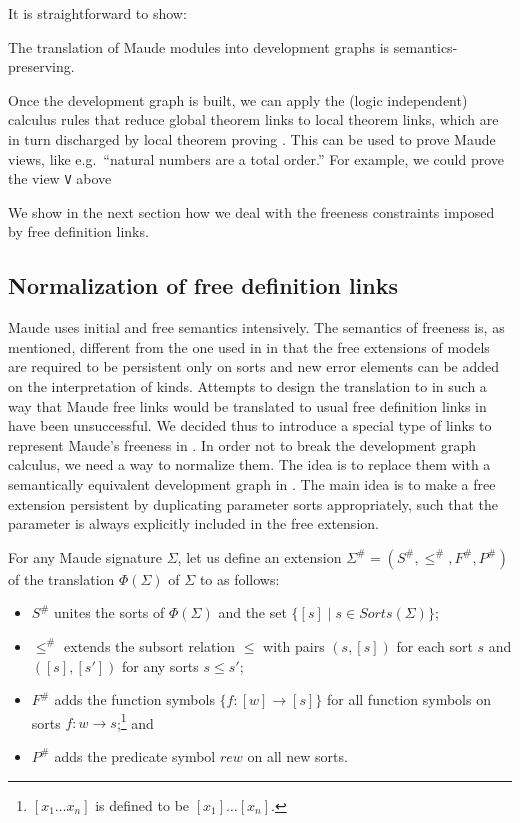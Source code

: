 It is straightforward to show:
\begin{theorem}
The translation of Maude modules into development graphs is
semantics-preserving.
\end{theorem}

Once the development graph is built, we can apply the (logic
independent) calculus rules that reduce global theorem links to local
theorem links, which are in turn discharged by local theorem proving
\cite{MAH-05-a}.  This can be used to prove Maude views, like e.g.\
``natural numbers are a total order.'' For example, we could prove
the view \verb"V" above


We show in the next
section how we deal with the freeness constraints imposed by free 
definition links.

\subsection{Normalization of free definition links}
\label{sec:free}

Maude uses initial and free semantics intensively. The semantics of
freeness is, as mentioned, different from the one used in \CASL in
that the free extensions of models are required to be persistent
only on sorts and new error elements can be added on the
interpretation of kinds. Attempts to design the translation to \CASL
in such a way that Maude free links would be translated to usual free
definition links in \CASL have been unsuccessful. We decided thus to
introduce a special type of links to represent Maude's freeness in
\CASL.  In order not to break the development graph calculus, we need
a way to normalize them. The idea is to replace them with a
semantically equivalent development graph in \CASL. The main idea is
to make a free extension persistent by duplicating parameter sorts
appropriately, such that the parameter is always explicitly included
in the free extension.

For any Maude signature $\Sigma$, let us define
an extension $\Sigma^\# = (S^\#, \leq^\#, F^\#, P^\#)$ of the
translation $\Phi(\Sigma)$ of $\Sigma$ to \CASL as follows:

\begin{itemize}

 \item $S^\#$ unites the sorts of $\Phi(\Sigma)$ and the set 
       $\{[s] \mid s \in Sorts(\Sigma)\}$;

 \item $\leq^\#$ extends the subsort relation $\leq$ with pairs
       $(s, [s])$ for each sort $s$ and $([s],[s'])$ for any sorts $s \leq s'$;

 \item $F^\#$ adds the function symbols $\{f:[w] \rightarrow [s]\}$ for all
       function symbols on sorts $f:w \rightarrow s $;\footnote{$[x_1 \ldots x_n]$
       is defined to be $[x_1] \ldots [x_n]$.} and
 \item $P^\#$ adds the predicate symbol $rew$ on all new sorts.
\end{itemize}

